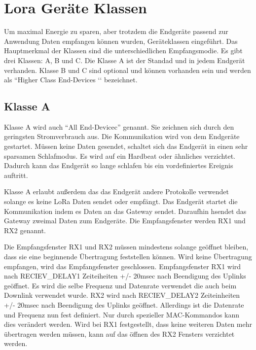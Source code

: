\documentclass[a4paper, 12pt]{article}
\begin{document}
    \section{Lora Geräte Klassen} \label{sec:klassen}
        Um maximal Energie zu sparen, aber trotzdem die Endgeräte passend zur Anwendung Daten empfangen können 
        wurden, Geräteklassen eingeführt. Das Hauptmerkmal der Klassen sind die unterschiedlichen Empfangsmodie. 
        Es gibt drei Klassen: A, B und C. Die Klasse A ist der Standad und in jedem Endgerät verhanden. Klasse B 
        und C sind optional und können vorhanden sein und werden als ``Higher Class End-Devices ‘‘ bezeichnet. \cite[S.10]{LoRaSpec}
        \subsection{Klasse A}\label{sec:ClassA}
            Klasse A wird auch ``All End-Devicec'' genannt. Sie zeichnen sich durch den geringsten Stromverbrauch aus. Die 
            Kommunikation wird von dem Endgeräte gestartet. Müssen keine Daten gesendet, schaltet sich 
            das Endgerät in einen sehr sparsamen Schlafmodus. Es wird auf ein Hardbeat oder ähnliches verzichtet.
            Dadurch kann das Endgerät so lange schlafen bis ein vordefiniertes Ereignis auftritt. 
            
            Klasse A erlaubt außerdem das das Endgerät andere Protokolle verwendet solange es keine LoRa Daten sendet 
            oder empfängt. \cite[S.11 ff.]{LoRaSpec} Das Endgerät startet 
            die Kommunikation indem es Daten an das Gateway sendet. Daraufhin hsendet das Gateway zweimal 
            Daten zum Endgeräte. Die Empfangsfenster werden RX1 und RX2 genannt. 

            Die Empfangsfenster RX1 und RX2 müssen mindestens solange geöffnet bleiben, dass sie eine beginnende 
            Übertragung feststellen können. Wird keine Übertragung empfangen, wird das Empfangsfenster 
            geschlossen. Empfangsfenster RX1 wird nach RECIEV\_DELAY1 Zeiteiheiten +/- 20msec nach Beendigung des 
            Uplinks geöffnet. Es wird die selbe Frequenz und Datenrate verwendet die auch beim Downlink verwendet 
            wurde. 
            RX2 wird nach RECIEV\_DELAY2 Zeiteinheiten +/- 20msec nach Beendigung des Uplinks geöffnet. Allerdings
            ist die Datenrate und Frequenz nun fest definiert. Nur durch spezieller MAC-Kommandos kann dies verändert werden.
            Wird bei RX1 festgestellt, dass keine weiteren Daten mehr übertragen werden müssen, 
            kann auf das öffnen des RX2 Fensters verzichtet werden.
            
\end{document}
